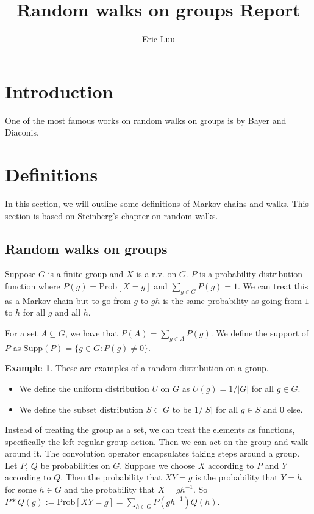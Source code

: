\documentclass[]{article}
\title{Random walks on groups Report}
\author{Eric Luu}
\theoremstyle{definition}
\newtheorem{example}[theorem]{Example}
\numberwithin{theorem}{section}
\numberwithin{equation}{section}
\newcommand{\supp}{\text{Supp}}
\begin{document}
\maketitle
\section{Introduction}


One of the most famous works on random walks on groups is \cite{bayerTrailingDovetailShuffle1992} by Bayer and Diaconis. 
\section{Definitions}
In this section, we will outline some definitions of Markov chains and walks. This section is based on Steinberg's chapter on random walks\cite{steinbergProbabilityRandomWalks2012}.

\subsection{Random walks on groups}
Suppose $G$ is a finite group and $X$ is a r.v. on $G$. $P$ is a probability distribution function where $P(g) = \text{Prob}[X = g]$ and $\sum_{g\in G} P(g) = 1$. We can treat this as a Markov chain but to go from $g$ to $gh$ is the same probability as going from $1$ to $h$ for all $g$ and all $h$. 

For a set $A \subseteq G$, we have that $P(A) = \sum_{g \in A} P(g)$. We define the support of $P$ as $\supp(P) = \lbrace g \in G : P(g) \neq 0 \rbrace$. 


\begin{example}
	These are examples of a random distribution on a group. 
	\begin{itemize}
		\item We define the uniform distribution $U$ on $G$ as $U(g) = 1/|G|$ for all $g \in G$. 
		\item We define the subset distribution $S \subset G$ to be $1/|S|$ for all $ g \in S$ and 0 else.
	\end{itemize}
\end{example}

Instead of treating the group as a set, we can treat the elements as functions, specifically the left regular group action. Then we can act on the group and walk around it. The convolution operator encapsulates taking steps around a group.
Let $P$, $Q$ be probabilities on $G$. Suppose we choose $X$ according to $P$ and $Y$ according to $Q$. Then the probability that $XY = g$ is the probability that $Y = h$ for some $h \in G$ and the probability that $X = gh^{-1}$. 
So $P \ast Q(g) := \text{Prob}[XY = g] = \sum_{h\in G} P(gh^{-1})Q(h) $.
\end{document}

